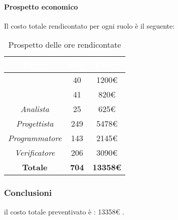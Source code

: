 \paragraph{Prospetto economico}
Il costo totale rendicontato per ogni ruolo è il seguente:
\begin{table}[H]
	\begin{center}
		\begin{tabular}{ c c c }
		\rowcolor{darkblue} 
		\textcolor{white}{\textbf{Ruolo}} & \textcolor{white}{\textbf{Ore}} & \textcolor{white}{\textbf{Costo}} \\ \hline
		\textit{\Responsabile} & 40 & 1200€ \\ \hline
		\textit{\Amministratore} & 41 & 820€ \\ \hline
		\textit{Analista} & 25 & 625€ \\ \hline
		\textit{Progettista} & 249 & 5478€ \\ \hline
		\textit{Programmatore} & 143 & 2145€ \\ \hline
		\textit{Verificatore} & 206 & 3090€ \\ \hline
		\textbf{Totale} & \textbf{704} & \textbf{13358€} \\ \hline
		\end{tabular}
	\caption{ Prospetto delle ore rendicontate}
	\end{center}
\end{table}
\subsubsection{Conclusioni}
il costo totale preventivato è : 13358€ .

